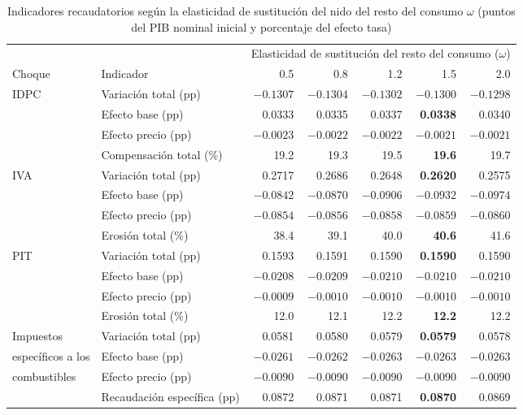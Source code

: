 \documentclass[11pt]{article}
\begin{document}
\begin{table}[H]
\centering
\caption{Indicadores recaudatorios según la elasticidad de sustitución del nido del resto del consumo $\omega$ (puntos del PIB nominal inicial y porcentaje del efecto tasa)}
\label{tab:sens-omega}
\small
\begin{tabular}{|l|l|r|r|r|r|r|}
  \hline
  & & \multicolumn{5}{c|}{Elasticidad de sustitución del resto del consumo ($\omega$)} \\
  \cline{3-7}
  Choque & Indicador & 0.5 & 0.8 & 1.2 & 1.5 & 2.0 \\
  \hline
  IDPC & Variación total (pp) & $-0.1307$ & $-0.1304$ & $-0.1302$ & $\mathbf{-0.1300}$ & $-0.1298$ \\
  & Efecto base (pp) & 0.0333 & 0.0335 & 0.0337 & \textbf{0.0338} & 0.0340 \\
  & Efecto precio (pp) & $-0.0023$ & $-0.0022$ & $-0.0022$ & $\mathbf{-0.0021}$ & $-0.0021$ \\
  & Compensación total (\%) & 19.2 & 19.3 & 19.5 & \textbf{19.6} & 19.7 \\
  \hline
  IVA & Variación total (pp) & 0.2717 & 0.2686 & 0.2648 & \textbf{0.2620} & 0.2575 \\
  & Efecto base (pp) & $-0.0842$ & $-0.0870$ & $-0.0906$ & $\mathbf{-0.0932}$ & $-0.0974$ \\
  & Efecto precio (pp) & $-0.0854$ & $-0.0856$ & $-0.0858$ & $\mathbf{-0.0859}$ & $-0.0860$ \\
  & Erosión total (\%) & 38.4 & 39.1 & 40.0 & \textbf{40.6} & 41.6 \\
  \hline
  PIT & Variación total (pp) & 0.1593 & 0.1591 & 0.1590 & \textbf{0.1590} & 0.1590 \\
  & Efecto base (pp) & $-0.0208$ & $-0.0209$ & $-0.0210$ & $\mathbf{-0.0210}$ & $-0.0210$ \\
  & Efecto precio (pp) & $-0.0009$ & $-0.0010$ & $-0.0010$ & $\mathbf{-0.0010}$ & $-0.0010$ \\
  & Erosión total (\%) & 12.0 & 12.1 & 12.2 & \textbf{12.2} & 12.2 \\
  \hline
  Impuestos & Variación total (pp) & 0.0581 & 0.0580 & 0.0579 & \textbf{0.0579} & 0.0578 \\
  específicos a los & Efecto base (pp) & $-0.0261$ & $-0.0262$ & $-0.0263$ & $\mathbf{-0.0263}$ & $-0.0263$ \\
  combustibles & Efecto precio (pp) & $-0.0090$ & $-0.0090$ & $-0.0090$ & $\mathbf{-0.0090}$ & $-0.0090$ \\
  & Recaudación específica (pp) & 0.0872 & 0.0871 & 0.0871 & \textbf{0.0870} & 0.0869 \\

\end{tabular}
\end{table}
\end{document}
